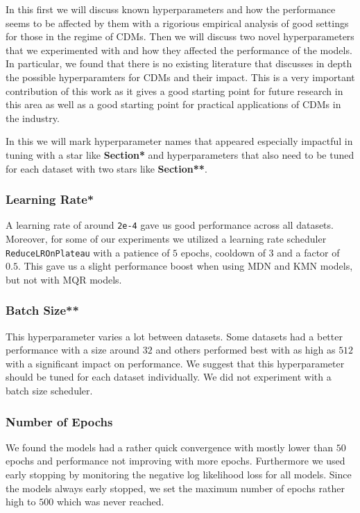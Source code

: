 In this  first we will discuss known hyperparameters and how the performance seems to be affected by them with a rigorious empirical analysis of good settings for those in the regime of CDMs. Then we will discuss two novel hyperparameters that we experimented with and how they affected the performance of the models. In particular, we found that there is no existing literature that discusses in depth the possible hyperparamters for CDMs and their impact. This is a very important contribution of this work as it gives a good starting point for future research in this area as well as a good starting point for practical applications of CDMs in the industry.

In this  we will mark hyperparameter names that appeared especially impactful in tuning with a star like \textbf{Section*} and hyperparameters that also need to be tuned for each dataset with two stars like \textbf{Section**}.

\subsubsection{Learning Rate*}

A learning rate of around \texttt{2e-4} gave us good performance across all datasets. Moreover, for some of our experiments we utilized a learning rate scheduler \texttt{ReduceLROnPlateau} with a patience of $5$ epochs, cooldown of $3$ and a factor of $0.5$. This gave us a slight performance boost when using MDN and KMN models, but not with MQR models.

\subsubsection{Batch Size**}

This hyperparameter varies a lot between datasets. Some datasets had a better performance with a size around $32$ and others performed best with as high as $512$ with a significant impact on performance. We suggest that this hyperparameter should be tuned for each dataset individually. We did not experiment with a batch size scheduler.

\subsubsection{Number of Epochs}

We found the models had a rather quick convergence with mostly lower than $50$ epochs and performance not improving with more epochs. Furthermore we used early stopping by monitoring the negative log likelihood loss for all models. Since the models always early stopped, we set the maximum number of epochs rather high to $500$ which was never reached.

